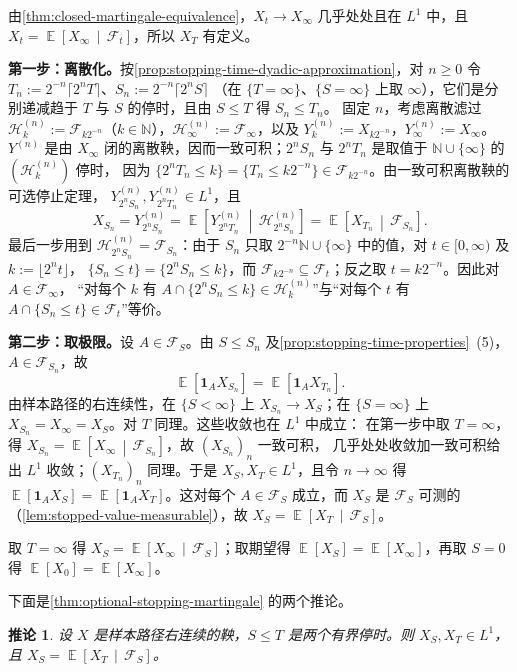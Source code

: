 \documentclass[UTF8,11pt,a4paper,oneside,fontset=fandol]{ctexrep}
\makeatletter
\numberwithin{equation}{section}
\theoremstyle{zhthm}
\newtheorem{corollary}[theorem]{推论}
\renewenvironment{proof}[1][\proofname]{\par
  \pushQED{\qed}%
  \normalfont\topsep6\p@\@plus6\p@\relax
  \trivlist
  \item[\hskip\labelsep\bfseries#1\hspace{0.5em}]\ignorespaces
}{%
  \popQED\endtrivlist\@endpefalse
}
\renewcommand{\proofname}{证明}
\newcommand{\N}{\mathbb{N}}
\newcommand{\F}{\mathcal{F}}
\newcommand{\Hcal}{\mathcal{H}}
\DeclareMathOperator{\E}{\mathbb{E}}
\newcommand{\ind}[1]{\mathbf{1}_{#1}}
\newcommand{\Econd}[2]{%
  \E\!\left[#1\,\middle|\,#2\right]}
\makeatother
\begin{document}
\begin{proof}
由\cref{thm:closed-martingale-equivalence}，$X_t\to X_\infty$ 几乎处处且在 $L^1$ 中，且 $X_t=\Econd{X_\infty}{\F_t}$，所以 $X_T$ 有定义。

\textbf{第一步：离散化。}按\cref{prop:stopping-time-dyadic-approximation}，对 $n\ge0$ 令 $T_n:=2^{-n}\lceil2^nT\rceil$、$S_n:=2^{-n}\lceil2^nS\rceil$
（在 $\{T=\infty\}$、$\{S=\infty\}$ 上取 $\infty$），它们是分别递减趋于 $T$ 与 $S$ 的停时，且由 $S\le T$ 得 $S_n\le T_n$。
固定 $n$，考虑离散滤过 $\Hcal^{(n)}_k:=\F_{k2^{-n}}$（$k\in\N$），$\Hcal^{(n)}_\infty:=\F_\infty$，以及 $Y^{(n)}_k:=X_{k2^{-n}}$，$Y^{(n)}_\infty:=X_\infty$。
$Y^{(n)}$ 是由 $X_\infty$ 闭的离散鞅，因而一致可积；$2^nS_n$ 与 $2^nT_n$ 是取值于 $\N\cup\{\infty\}$ 的 $(\Hcal^{(n)}_k)$ 停时，
因为 $\{2^nT_n\le k\}=\{T_n\le k2^{-n}\}\in\F_{k2^{-n}}$。由一致可积离散鞅的可选停止定理\cite[附录 A2]{LeGall2016}，
$Y^{(n)}_{2^nS_n},Y^{(n)}_{2^nT_n}\in L^1$，且
\[
  X_{S_n}=Y^{(n)}_{2^nS_n}=\Econd{Y^{(n)}_{2^nT_n}}{\Hcal^{(n)}_{2^nS_n}}=\Econd{X_{T_n}}{\F_{S_n}}.
\]
最后一步用到 $\Hcal^{(n)}_{2^nS_n}=\F_{S_n}$：由于 $S_n$ 只取 $2^{-n}\N\cup\{\infty\}$ 中的值，对 $t\in[0,\infty)$ 及 $k:=\lfloor2^nt\rfloor$，
$\{S_n\le t\}=\{2^nS_n\le k\}$，而 $\F_{k2^{-n}}\subseteq\F_t$；反之取 $t=k2^{-n}$。因此对 $A\in\F_\infty$，
“对每个 $k$ 有 $A\cap\{2^nS_n\le k\}\in\Hcal^{(n)}_k$”与“对每个 $t$ 有 $A\cap\{S_n\le t\}\in\F_t$”等价。

\textbf{第二步：取极限。}设 $A\in\F_S$。由 $S\le S_n$ 及\cref{prop:stopping-time-properties}~(5)，$A\in\F_{S_n}$，故
\[
  \E[\ind AX_{S_n}]=\E[\ind AX_{T_n}].
\]
由样本路径的右连续性，在 $\{S<\infty\}$ 上 $X_{S_n}\to X_S$；在 $\{S=\infty\}$ 上 $X_{S_n}=X_\infty=X_S$。对 $T$ 同理。这些收敛也在 $L^1$ 中成立：
在第一步中取 $T=\infty$，得 $X_{S_n}=\Econd{X_\infty}{\F_{S_n}}$，故 $(X_{S_n})_n$ 一致可积\cite[定理 4.6.1]{Durrett2019}，
几乎处处收敛加一致可积给出 $L^1$ 收敛\cite[定理 4.6.3]{Durrett2019}；$(X_{T_n})_n$ 同理。于是 $X_S,X_T\in L^1$，且令 $n\to\infty$ 得
$\E[\ind AX_S]=\E[\ind AX_T]$。这对每个 $A\in\F_S$ 成立，而 $X_S$ 是 $\F_S$ 可测的（\cref{lem:stopped-value-measurable}），故 $X_S=\Econd{X_T}{\F_S}$。

取 $T=\infty$ 得 $X_S=\Econd{X_\infty}{\F_S}$；取期望得 $\E[X_S]=\E[X_\infty]$，再取 $S=0$ 得 $\E[X_0]=\E[X_\infty]$。
\end{proof}

下面是\cref{thm:optional-stopping-martingale} 的两个推论。

\begin{corollary}
\label{cor:optional-stopping-bounded}
设 $X$ 是样本路径右连续的鞅，$S\le T$ 是两个有界停时。则 $X_S,X_T\in L^1$，且 $X_S=\Econd{X_T}{\F_S}$。
\end{corollary}
\end{document}

